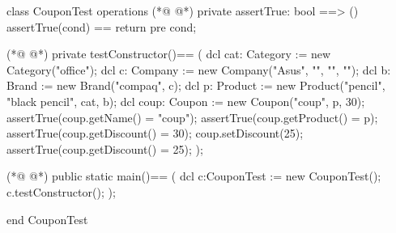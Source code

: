 \begin{vdmpp}[breaklines=true]
class CouponTest
 operations
(*@
\label{assertTrue:3}
@*)
  private assertTrue: bool ==> ()
    assertTrue(cond) == return
    pre cond;
    
(*@
\label{testConstructor:7}
@*)
  private testConstructor()==
  (
    dcl cat: Category := new Category("office");
   dcl c: Company := new Company("Asus", "", "", "");
   dcl b: Brand := new Brand("compaq", c);
    dcl p: Product := new Product("pencil", "black pencil", cat, b);
   dcl coup: Coupon := new Coupon("coup", p, 30);
   assertTrue(coup.getName() = "coup");
   assertTrue(coup.getProduct() = p);
   assertTrue(coup.getDiscount() = 30);
   coup.setDiscount(25);
   assertTrue(coup.getDiscount() = 25);
  );
 
(*@
\label{main:21}
@*)
  public static main()==
    (
   dcl c:CouponTest := new CouponTest();
   c.testConstructor();
    );

end CouponTest
\end{vdmpp}
